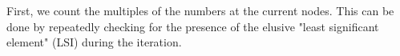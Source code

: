 \documentclass[preview]{standalone}
\begin{document}
First, we count the multiples of the numbers at the current nodes. This can be done by repeatedly checking for the presence of the elusive "least significant element" (LSI) during the iteration.\\
\end{document}
